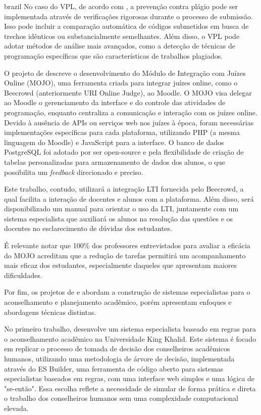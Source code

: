 \begin{otherlanguage*}{brazil}
No caso do VPL, de acordo com \textcite{rodriguezdelpinoandroyo}, a prevenção contra plágio pode ser implementada através de verificações rigorosas durante o processo de submissão. Isso pode incluir a comparação automática de códigos submetidos em busca de trechos idênticos ou substancialmente semelhantes. Além disso, o VPL pode adotar métodos de análise mais avançados, como a detecção de técnicas de programação específicas que são características de trabalhos plagiados.

O projeto de \textcite{joseosvaldochaves} descreve o desenvolvimento do Módulo de Integração com Juízes Online (MOJO), uma ferramenta criada para integrar juízes online, como o Beecrowd (anteriormente URI Online Judge), ao Moodle. O MOJO visa delegar ao Moodle o gerenciamento da interface e do controle das atividades de programação, enquanto centraliza a comunicação e interação com os juízes online. Devido à ausência de APIs ou serviços web nos juízes à época, foram necessárias implementações específicas para cada plataforma, utilizando PHP (a mesma linguagem do Moodle) e JavaScript para a interface. O banco de dados PostgreSQL foi adotado por ser open-source e pela flexibilidade de criação de tabelas personalizadas para armazenamento de dados dos alunos, o que possibilita um \textit{feedback} direcionado e preciso.

Este trabalho, contudo, utilizará a integração LTI fornecida pelo Beecrowd, a qual facilita a interação de docentes e alunos com a plataforma. Além disso, será disponibilizado um manual para orientar o uso da LTI, juntamente com um sistema especialista que auxiliará os alunos na resolução das questões e os docentes no esclarecimento de dúvidas dos estudantes.

É relevante notar que 100\% dos professores entrevistados para avaliar a eficácia do MOJO acreditam que a redução de tarefas permitirá um acompanhamento mais eficaz dos estudantes, especialmente daqueles que apresentam maiores dificuldades.

Por fim, os projetos de \textcite{osmannasr} e \textcite{neildunstan} abordam a construção de sistemas especialistas para o aconselhamento e planejamento acadêmico, porém apresentam enfoques e abordagens técnicas distintas.

No primeiro trabalho, \textcite{osmannasr} desenvolve um sistema especialista baseado em regras para o aconselhamento acadêmico na Universidade King Khalid. Este sistema é focado em replicar o processo de tomada de decisão dos conselheiros acadêmicos humanos, utilizando uma metodologia de árvore de decisão, implementada através do ES Builder, uma ferramenta de código aberto para sistemas especialistas baseados em regras, com uma interface web simples e uma lógica de "se-então". Essa escolha reflete a necessidade de simular de forma prática e direta o trabalho dos conselheiros humanos sem uma complexidade computacional elevada.


\end{otherlanguage*}
